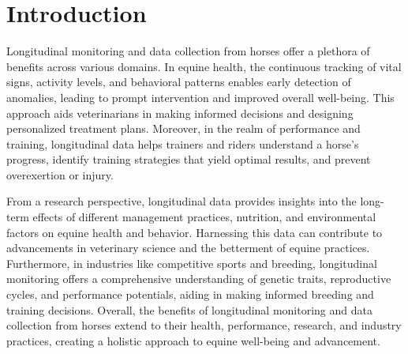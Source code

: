 \section{Introduction}
\label{sec:intro_introduction}

Longitudinal monitoring and data collection from horses offer a plethora of benefits across various domains. In equine health, the continuous tracking of vital signs, activity levels, and behavioral patterns enables early detection of anomalies, leading to prompt intervention and improved overall well-being. This approach aids veterinarians in making informed decisions and designing personalized treatment plans. Moreover, in the realm of performance and training, longitudinal data helps trainers and riders understand a horse's progress, identify training strategies that yield optimal results, and prevent overexertion or injury.

From a research perspective, longitudinal data provides insights into the long-term effects of different management practices, nutrition, and environmental factors on equine health and behavior. Harnessing this data can contribute to advancements in veterinary science and the betterment of equine practices. Furthermore, in industries like competitive sports and breeding, longitudinal monitoring offers a comprehensive understanding of genetic traits, reproductive cycles, and performance potentials, aiding in making informed breeding and training decisions. Overall, the benefits of longitudinal monitoring and data collection from horses extend to their health, performance, research, and industry practices, creating a holistic approach to equine well-being and advancement.

